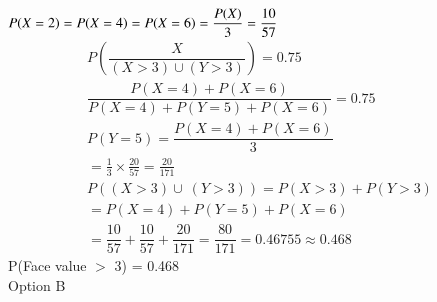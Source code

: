\documentclass[journal,12pt,twocolumn]{IEEEtran}
\begin{document}
$P(X = 2) = P(X = 4) = P(X = 6) = \dfrac{P(X)}{3} = \dfrac{10}{57}\\$
\begin{align}
P\left(\dfrac{X}{(X > 3)\cup (Y > 3)}\right) = 0.75\\[5pt]
\dfrac{P(X = 4) + P(X = 6)}{P(X = 4) + P(Y = 5) + P(X = 6)} = 0.75\\[5pt]
P(Y = 5) = \dfrac {P(X = 4) + P(X = 6)}{3}\\[5pt]
= \frac{1}{3}\times\frac{20}{57} = \frac{20}{171}\\[5pt]
P((X > 3) \cup\ (Y > 3)) = P(X > 3) + P(Y > 3)\\[4pt]
= P(X = 4) + P(Y = 5) + P(X = 6)\\
= \dfrac{10}{57} + \dfrac{10}{57} + \dfrac{20}{171} = \dfrac{80}{171} = 0.46755 \approx 0.468
\end{align}
\centering
\Large P(Face value $>$ 3) = 0.468\\[5pt]
Option B
\end{document}
